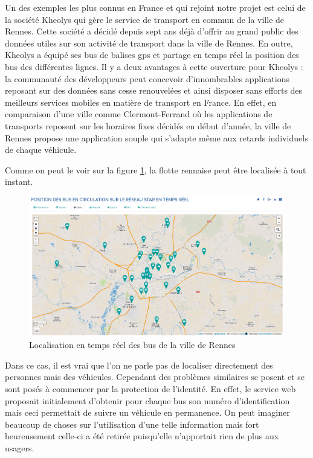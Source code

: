 Un des exemples les plus connus en France et qui rejoint notre projet est celui de la société Kheolys qui gère le service de transport en commun de la ville de Rennes. Cette société a décidé depuis sept ans déjà d’offrir au grand public des données utiles sur son activité de transport dans la ville de Rennes. En outre, Kheolys a équipé ses bus de balises gps et partage en temps réel la position des bus des différentes lignes. Il y a deux avantages à cette ouverture pour Kheolys : la communauté des développeurs peut concevoir d’innombrables applications reposant sur des données sans cesse renouvelées et ainsi disposer sans efforts des meilleurs services mobiles en matière de transport en France. En effet, en comparaison d’une ville comme Clermont-Ferrand où les applications de transports reposent sur les horaires fixes décidés en début d’année, la ville de Rennes propose une application souple qui s’adapte même aux retards individuels de chaque véhicule.

Comme on peut le voir sur la figure \ref{rennes}, la flotte rennaise peut être localisée à tout instant.

\begin{figure}[H]
    \centering
    \includegraphics[width=\textwidth]{./img/rennes.png}
    \caption{Localisation en temps réel des bus de la ville de Rennes}
    \label{rennes}
\end{figure}

Dans ce cas, il est vrai que l’on ne parle pas de localiser directement des personnes mais des véhicules. Cependant des problèmes similaires se posent et se sont posés à commencer par la protection de l’identité. En effet, le service web proposait initialement d’obtenir pour chaque bus son numéro d’identification mais ceci permettait de suivre un véhicule en permanence. On peut imaginer beaucoup de choses sur l’utilisation d’une telle information mais fort heureusement celle-ci a été retirée puisqu’elle n’apportait rien de plus aux usagers.

